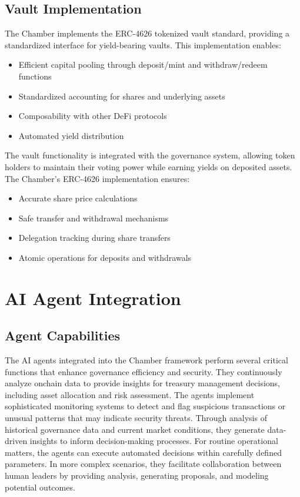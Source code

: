 \documentclass[12pt]{article}
\begin{document}
\subsection{Vault Implementation}
The Chamber implements the ERC-4626 tokenized vault standard, providing a standardized interface for yield-bearing vaults. This implementation enables:
\begin{itemize}
    \item Efficient capital pooling through deposit/mint and withdraw/redeem functions
    \item Standardized accounting for shares and underlying assets
    \item Composability with other DeFi protocols
    \item Automated yield distribution
\end{itemize}

The vault functionality is integrated with the governance system, allowing token holders to maintain their voting power while earning yields on deposited assets. The Chamber's ERC-4626 implementation ensures:
\begin{itemize}
    \item Accurate share price calculations
    \item Safe transfer and withdrawal mechanisms
    \item Delegation tracking during share transfers
    \item Atomic operations for deposits and withdrawals
\end{itemize}

\section{AI Agent Integration}

\subsection{Agent Capabilities}
The AI agents integrated into the Chamber framework perform several critical functions that enhance governance efficiency and security. They continuously analyze onchain data to provide insights for treasury management decisions, including asset allocation and risk assessment. The agents implement sophisticated monitoring systems to detect and flag suspicious transactions or unusual patterns that may indicate security threats. Through analysis of historical governance data and current market conditions, they generate data-driven insights to inform decision-making processes. For routine operational matters, the agents can execute automated decisions within carefully defined parameters. In more complex scenarios, they facilitate collaboration between human leaders by providing analysis, generating proposals, and modeling potential outcomes.
\end{document}
